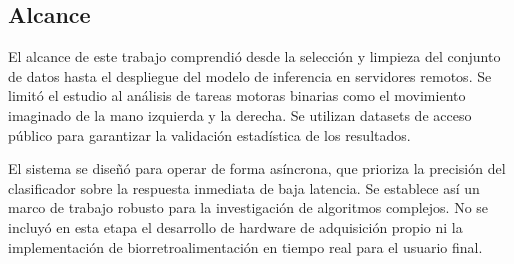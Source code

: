 \subsection{Alcance}

El alcance de este trabajo comprendió desde la selección y limpieza del conjunto de datos hasta el despliegue del modelo de inferencia en servidores remotos. Se limitó el estudio al análisis de tareas motoras binarias como el movimiento imaginado de la mano izquierda y la derecha. Se utilizan datasets de acceso público para garantizar la validación estadística de los resultados.


El sistema se diseñó para operar de forma asíncrona, que prioriza la precisión del clasificador sobre la respuesta inmediata de baja latencia. Se establece así un marco de trabajo robusto para la investigación de algoritmos complejos. No se incluyó en esta etapa el desarrollo de hardware de adquisición propio ni la implementación de biorretroalimentación en tiempo real para el usuario final.